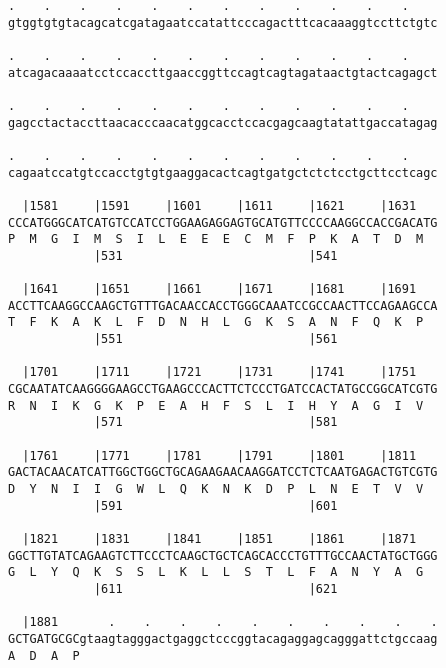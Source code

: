 \documentclass{article}
\begin{document}
\begin{Verbatim}
.    .    .    .    .    .    .    .    .    .    .    .    
gtggtgtgtacagcatcgatagaatccatattcccagactttcacaaaggtccttctgtc
                                                            
.    .    .    .    .    .    .    .    .    .    .    .    
atcagacaaaatcctccaccttgaaccggttccagtcagtagataactgtactcagagct
                                                            
.    .    .    .    .    .    .    .    .    .    .    .    
gagcctactaccttaacacccaacatggcacctccacgagcaagtatattgaccatagag
                                                            
.    .    .    .    .    .    .    .    .    .    .    .    
cagaatccatgtccacctgtgtgaaggacactcagtgatgctctctcctgcttcctcagc
                                                            
  |1581     |1591     |1601     |1611     |1621     |1631   
CCCATGGGCATCATGTCCATCCTGGAAGAGGAGTGCATGTTCCCCAAGGCCACCGACATG
P  M  G  I  M  S  I  L  E  E  E  C  M  F  P  K  A  T  D  M  
            |531                          |541              
  
  |1641     |1651     |1661     |1671     |1681     |1691   
ACCTTCAAGGCCAAGCTGTTTGACAACCACCTGGGCAAATCCGCCAACTTCCAGAAGCCA
T  F  K  A  K  L  F  D  N  H  L  G  K  S  A  N  F  Q  K  P  
            |551                          |561              
  
  |1701     |1711     |1721     |1731     |1741     |1751   
CGCAATATCAAGGGGAAGCCTGAAGCCCACTTCTCCCTGATCCACTATGCCGGCATCGTG
R  N  I  K  G  K  P  E  A  H  F  S  L  I  H  Y  A  G  I  V  
            |571                          |581              
  
  |1761     |1771     |1781     |1791     |1801     |1811   
GACTACAACATCATTGGCTGGCTGCAGAAGAACAAGGATCCTCTCAATGAGACTGTCGTG
D  Y  N  I  I  G  W  L  Q  K  N  K  D  P  L  N  E  T  V  V  
            |591                          |601              
  
  |1821     |1831     |1841     |1851     |1861     |1871   
GGCTTGTATCAGAAGTCTTCCCTCAAGCTGCTCAGCACCCTGTTTGCCAACTATGCTGGG
G  L  Y  Q  K  S  S  L  K  L  L  S  T  L  F  A  N  Y  A  G  
            |611                          |621              
  
  |1881       .    .    .    .    .    .    .    .    .    .
GCTGATGCGCgtaagtagggactgaggctcccggtacagaggagcagggattctgccaag
A  D  A  P                                                  
                                                            

\end{Verbatim}
\end{document}
